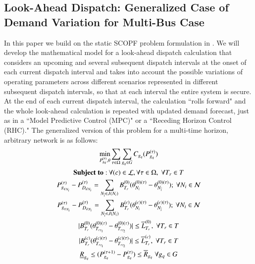 \documentclass[preprint,12pt,3p]{elsarticle}
\begin{document}
\subsection{Look-Ahead Dispatch: Generalized Case of Demand Variation for Multi-Bus Case}
In this paper we build on the static SCOPF problem formulation in \cite{CK:14}. We will develop the mathematical model for a look-ahead dispatch calculation that considers an upcoming and several subsequent dispatch intervals at the onset of each current dispatch interval and takes into account the possible variations of operating parameters across different scenarios represented in different subsequent dispatch intervals, so that at each interval the entire system is secure. At the end of each current dispatch interval, the calculation ``rolls forward" and the whole look-ahead calculation is repeated with updated demand forecast, just as in a ``Model Predictive Control (MPC)" or a ``Receding Horizon Control (RHC)." The generalized version of this problem for a multi-time horizon, arbitrary network is as follows:
\begin{subequations}\label{Look-Ahead_General_Ang_Inc}
\begin{gather}
\min_{P_{g_q}^{(\tau)},\theta}\sum_{\tau\in \Omega}\sum_{g_q\in G}C_{g_q}(P_{g_q}^{(\tau)})\label{first_Look-Ahead_General_Ang_Inc}\\
\mathbf{Subject\;to:}\:\forall(c)\in\mathcal{L},\forall \tau \in \Omega,\;\forall T_r\in T\notag\\
P_{{g_q}_{N_i}}^{(\tau)}-P_{{D_d}_{N_i}}^{(\tau)}=\sum_{N_{\overline{i}}\in{J(N_i)}}B_{T_r}^{(0)}(\theta_{N_i}^{(0)(\tau)}-\theta_{N_{\overline{i}}}^{(0)(\tau)});\ \forall{{N_i}\in\mathcal{N}}\label{second_Look-Ahead_General_Ang_Inc}\\
P_{{g_q}_{N_i}}^{(\tau)}-P_{{D_d}_{N_i}}^{(\tau)}=\sum_{N_{\overline{i}}\in{J(N_i)}}B_{T_r}^{(c)}(\theta_{N_i}^{(c)(\tau)}-\theta_{N_{\overline{i}}}^{(c)(\tau)});\ \forall{{N_i}\in\mathcal{N}}\label{second I_Look-Ahead_General_Ang_Inc}\\
|B_{T_r}^{(0)}(\theta_{{T_r}_{t_1}}^{(0)(\tau)}-\theta_{{T_r}_{t_2}}^{(0)(\tau)})|\leq{{\overline{L}}_{T_r}^{(0)}},\;\forall{T_r\in{T}}\label{third_Look-Ahead_General_Ang_Inc}\\
|B_{T_r}^{(c)}(\theta_{{T_r}_{t_1}}^{(c)(\tau)}-\theta_{{T_r}_{t_2}}^{(c)(\tau)})|\leq{{\overline{L}}_{T_r}^{(c)}},\;\forall{T_r\in{T}}\label{fourth_Look-Ahead_General_Ang_Inc}\\
\underline{R}_{g_q}\leq(P_{g_q}^{(\tau+1)}-P_{g_q}^{(\tau)})\leq \overline{R}_{g_q}\; \forall {g_q}\in G\label{fifth_Look-Ahead_General_Ang_Inc}
\end{gather}
\end{subequations}
\end{document}
